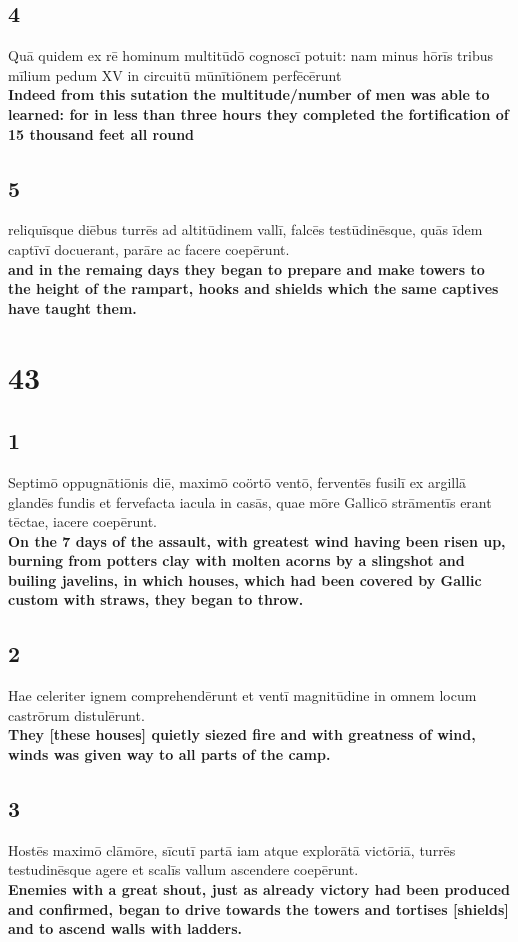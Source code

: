 \documentclass{article}
\begin{document}
\subsection*{4}
Quā quidem ex rē hominum multitūdō cognoscī potuit: nam minus hōrīs tribus mīlium pedum XV in circuitū mūnītiōnem perfēcērunt  \\
\textbf{Indeed from this sutation the multitude/number of men was able to learned: for in less than three hours they completed the fortification of 15 thousand feet all round}

\subsection*{5}
reliquīsque diēbus turrēs ad altitūdinem vallī, falcēs testūdinēsque, quās īdem captīvī docuerant, parāre ac facere coepērunt. \\
\textbf{and in the remaing days they began to prepare and make towers to the height of the rampart, hooks and shields which the same captives have taught them.}

\section*{43}

\subsection*{1}
Septimō oppugnātiōnis diē, maximō coörtō ventō, ferventēs fusilī ex argillā glandēs fundis et fervefacta iacula in casās, quae mōre Gallicō strāmentīs erant tēctae, iacere coepērunt. \\
\textbf{On the 7 days of the assault, with greatest wind having been risen up, burning from potters clay with molten acorns by a slingshot and builing javelins, in which houses, which had been covered by Gallic custom with straws, they began to throw.}

\subsection*{2}
Hae celeriter ignem comprehendērunt et ventī magnitūdine in omnem locum castrōrum distulērunt.\\
\textbf{They [these houses] quietly siezed fire and with greatness of wind, winds was given way to all parts of the camp.}

\subsection*{3}
Hostēs maximō clāmōre, sīcutī partā iam atque explorātā victōriā, turrēs testudinēsque agere et scalīs vallum ascendere coepērunt. \\
\textbf{Enemies with a great shout, just as already victory had been produced and confirmed, began to drive towards the towers and tortises [shields] and to ascend walls with ladders.}
\end{document}
